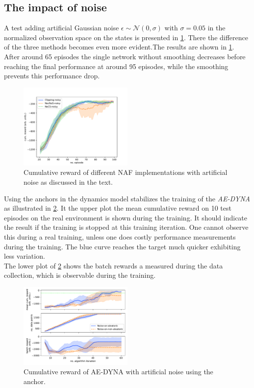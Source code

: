 \documentclass[
 reprint,
 amsmath,amssymb,amsfonts,clevref,
 aps,
prstab,
]{revtex4-2}
\begin{document}
\subsection{The impact of noise}
A test adding artificial Gaussian noise $\epsilon \sim \mathcal{N}(0, \sigma)$ with $\sigma=0.05$ in the normalized observation space on the states is presented in \cref{fig:comparsion_noise}. There the difference of the three methods becomes even more evident.The results are shown in \cref{fig:comparsion_noise}. After around 65 episodes the single network without smoothing decreases before reaching the final performance at around 95 episodes, while the smoothing prevents this performance drop. 
\begin{figure}[!h]
	\centering
	\includegraphics*[width=0.5\textwidth]{Figures/Comparison_noise}
	\caption{Cumulative reward of different NAF implementations with artificial noise as discussed in the text.}
	\label{fig:comparsion_noise}
\end{figure}
Using the anchors in the dynamics model stabilizes the training of the \emph{AE-DYNA} as illustrated in \cref{fig:comparsion_noise_ae_dyna}. It the upper plot the mean cumulative reward on 10 test episodes on the real environment is shown during the training. It should indicate the result if the training is stopped at this training iteration. One cannot observe this during a real training, unless one does costly performance measurements during the training. The blue curve reaches the target much quicker exhibiting less variation.\\
The lower plot of \cref{fig:comparsion_noise_ae_dyna} shows the batch rewards a measured during the data collection, which is observable during the training.
\begin{figure}[!h]
	\centering
	\includegraphics*[width=0.5\textwidth]{Figures/Comparison_noise_ae_dyna}
	\caption{Cumulative reward of AE-DYNA with artificial noise using the anchor.}
	\label{fig:comparsion_noise_ae_dyna}
\end{figure}
\end{document}
